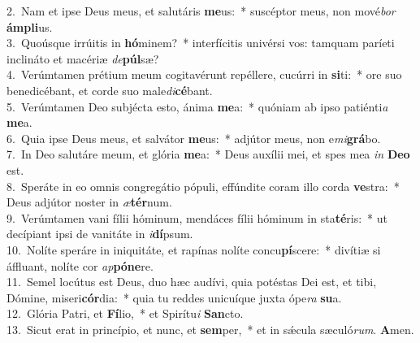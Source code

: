 {2.~}Nam et ipse Deus meus, et salutáris \textbf{me}us:~* suscéptor meus, non mové\textit{bor} \textbf{ám}\textbf{pli}us.\\
{3.~}Quoúsque irrúitis in \textbf{hó}minem?~* interfícitis univérsi vos: tamquam paríeti inclináto et macériæ \textit{de}\textbf{púl}sæ?\\
{4.~}Verúmtamen prétium meum cogitavérunt repéllere, cucúrri in \textbf{si}ti:~* ore suo benedicébant, et corde suo male\textit{di}\textbf{cé}bant.\\
{5.~}Verúmtamen Deo subjécta esto, ánima \textbf{me}a:~* quóniam ab ipso patiénti\textit{a} \textbf{me}a.\\
{6.~}Quia ipse Deus meus, et salvátor \textbf{me}us:~* adjútor meus, non e\textit{mi}\textbf{grá}bo.\\
{7.~}In Deo salutáre meum, et glória \textbf{me}a:~* Deus auxílii mei, et spes mea \textit{in} \textbf{De}\textbf{o} est.\\
{8.~}Speráte in eo omnis congregátio pópuli, effúndite coram illo corda \textbf{ve}stra:~* Deus adjútor noster in \textit{æ}\textbf{tér}num.\\
{9.~}Verúmtamen vani fílii hóminum, mendáces fílii hóminum in sta\textbf{té}ris:~* ut decípiant ipsi de vanitáte in \textit{i}\textbf{dí}psum.\\
{10.~}Nolíte speráre in iniquitáte, et rapínas nolíte concu\textbf{pí}scere:~* divítiæ si áffluant, nolíte cor \textit{ap}\textbf{pó}\textbf{ne}re.\\
{11.~}Semel locútus est Deus, duo hæc audívi, quia potéstas Dei est, et tibi, Dómine, miseri\textbf{cór}dia:~* quia tu reddes unicuíque juxta ópe\textit{ra} \textbf{su}a.\\
{12.~}Glória Patri, et \textbf{Fí}lio,~* et Spirítu\textit{i} \textbf{San}cto.\\
{13.~}Sicut erat in princípio, et nunc, et \textbf{sem}per,~* et in sǽcula sæculó\textit{rum}. \textbf{A}men.\\
